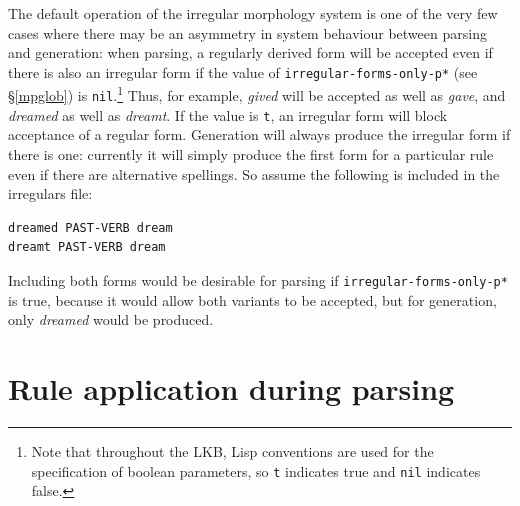 \documentclass[12pt]{report}
\newcommand{\lkbparam}[1]{{\tt #1}}
\begin{document}
The default operation of the irregular morphology system is 
one of the very few cases where there may be an asymmetry in system
behaviour between parsing and generation: when parsing, 
a regularly derived form will be accepted even if there
is also an irregular form if the value of 
\lkbparam{*irregular-forms-only-p*} (see \S\ref{mpglob}) is 
{\tt nil}.\footnote{Note that throughout the
LKB, Lisp conventions are used
for the specification of boolean parameters, so {\tt t} indicates
true and {\tt nil} indicates false.}
Thus, for example, {\it gived} will be accepted as well as {\it gave},
and {\it dreamed} as well as {\it dreamt}.  If the value is {\tt t},
an irregular form will block acceptance of a regular form.
Generation will always produce the irregular form if there is one:
currently it will simply produce the first form for a particular rule
even if there are alternative spellings.  So assume the following
is included in the irregulars file:
\begin{verbatim}
dreamed PAST-VERB dream
dreamt PAST-VERB dream
\end{verbatim}
Including both forms would be desirable for parsing if
\lkbparam{*irregular-forms-only-p*} is true, because it would allow 
both variants to be accepted, but for generation, only {\it dreamed}
would be produced.


\section{Rule application during parsing}
\label{parse}
\end{document}
